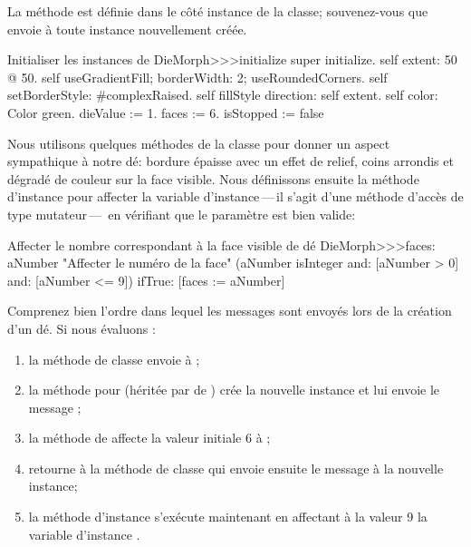 \documentclass[a4paper,10pt,twoside]{book}
\begin{document}
La m\'ethode  est d\'efinie dans le c\^ot\'e instance
de la classe; souvenez-vous que  envoie  \`a
toute instance nouvellement cr\'e\'ee.

\begin{method}{Initialiser les instances de }
DieMorph>>>initialize
	super initialize.
	self extent: 50 @ 50.
	self useGradientFill; borderWidth: 2; useRoundedCorners.
	self setBorderStyle: #complexRaised.
	self fillStyle direction: self extent.
	self color: Color green.
	dieValue := 1.
	faces := 6.
	isStopped := false
\end{method}

Nous utilisons quelques m\'ethodes de la classe 
pour donner un aspect sympathique \`a notre d\'e: bordure \'epaisse
avec un effet de relief, coins arrondis et d\'egrad\'e de couleur sur
la face visible.
Nous d\'efinissons ensuite la m\'ethode d'instance  pour
affecter la variable d'instance\,---\,il s'agit d'une m\'ethode
d'acc\`es de type mutateur\,---\, en v\'erifiant que le param\`etre est
bien valide:
\begin{method}{Affecter le nombre correspondant \`a la face visible de d\'e}
DieMorph>>>faces: aNumber
	"Affecter le num\'ero de la face"
	(aNumber isInteger
			and: [aNumber > 0]
			and: [aNumber <= 9])
		ifTrue: [faces := aNumber]
\end{method}

Comprenez bien l'ordre dans lequel les messages sont envoy\'es lors de
la cr\'eation d'un d\'e. Si nous \'evaluons :
\begin{enumerate}
	\item la m\'ethode de classe  envoie
       \`a ;
	\item la m\'ethode pour  (h\'erit\'ee par  de ) cr\'ee la nouvelle instance et lui envoie
       le message ;
	\item la m\'ethode  de  affecte la
      valeur initiale 6 \`a ;
	\item {} retourne \`a la m\'ethode de
      classe  qui envoie ensuite le
      message  \`a la nouvelle instance;
	\item la m\'ethode d'instance  s'ex\'ecute
      maintenant en affectant \`a la valeur 9 la variable d'instance
      .
\end{enumerate}
\end{document}
